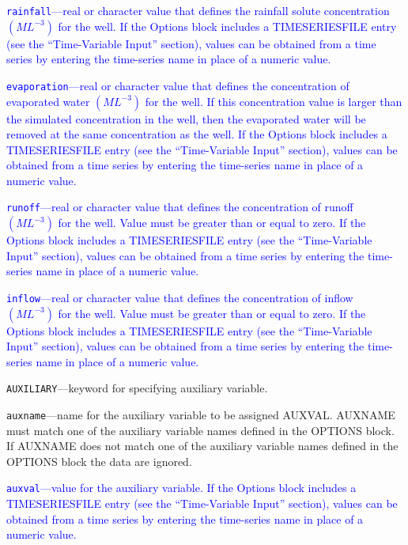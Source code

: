 \begin{description}
\item \textcolor{blue}{\texttt{rainfall}---real or character value that defines the rainfall solute concentration $(ML^{-3})$ for the well. If the Options block includes a TIMESERIESFILE entry (see the ``Time-Variable Input'' section), values can be obtained from a time series by entering the time-series name in place of a numeric value.}

\item \textcolor{blue}{\texttt{evaporation}---real or character value that defines the concentration of evaporated water $(ML^{-3})$ for the well. If this concentration value is larger than the simulated concentration in the well, then the evaporated water will be removed at the same concentration as the well.  If the Options block includes a TIMESERIESFILE entry (see the ``Time-Variable Input'' section), values can be obtained from a time series by entering the time-series name in place of a numeric value.}

\item \textcolor{blue}{\texttt{runoff}---real or character value that defines the concentration of runoff $(ML^{-3})$ for the well. Value must be greater than or equal to zero. If the Options block includes a TIMESERIESFILE entry (see the ``Time-Variable Input'' section), values can be obtained from a time series by entering the time-series name in place of a numeric value.}

\item \textcolor{blue}{\texttt{inflow}---real or character value that defines the concentration of inflow $(ML^{-3})$ for the well. Value must be greater than or equal to zero. If the Options block includes a TIMESERIESFILE entry (see the ``Time-Variable Input'' section), values can be obtained from a time series by entering the time-series name in place of a numeric value.}

\item \texttt{AUXILIARY}---keyword for specifying auxiliary variable.

\item \texttt{auxname}---name for the auxiliary variable to be assigned AUXVAL.  AUXNAME must match one of the auxiliary variable names defined in the OPTIONS block. If AUXNAME does not match one of the auxiliary variable names defined in the OPTIONS block the data are ignored.

\item \textcolor{blue}{\texttt{auxval}---value for the auxiliary variable. If the Options block includes a TIMESERIESFILE entry (see the ``Time-Variable Input'' section), values can be obtained from a time series by entering the time-series name in place of a numeric value.}

\end{description}

